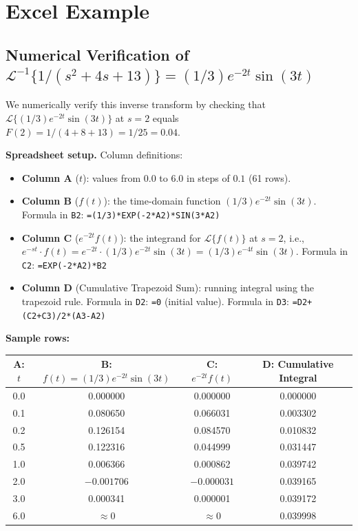 \documentclass[12pt,a4paper]{article}
\begin{document}
\section{Excel Example }

\subsection{Numerical Verification of $\mathcal{L}^{-1}\{1/(s^2+4s+13)\} = (1/3)e^{-2t}\sin(3t)$}

We numerically verify this inverse transform by checking that
$\mathcal{L}\{(1/3)e^{-2t}\sin(3t)\}$ at $s = 2$ equals
$F(2) = 1/(4 + 8 + 13) = 1/25 = 0.04$.

\medskip
\textbf{Spreadsheet setup.} Column definitions:
\begin{itemize}[leftmargin=*]
  \item \textbf{Column A} ($t$): values from $0.0$ to $6.0$ in steps of $0.1$ (61 rows).
  \item \textbf{Column B} ($f(t)$): the time-domain function $(1/3)e^{-2t}\sin(3t)$.
    Formula in \texttt{B2}: \texttt{=(1/3)*EXP(-2*A2)*SIN(3*A2)}
  \item \textbf{Column C} ($e^{-2t}f(t)$): the integrand for $\mathcal{L}\{f(t)\}$ at $s = 2$,
    i.e., $e^{-st}\cdot f(t) = e^{-2t}\cdot (1/3)e^{-2t}\sin(3t) = (1/3)e^{-4t}\sin(3t)$.
    Formula in \texttt{C2}: \texttt{=EXP(-2*A2)*B2}
  \item \textbf{Column D} (Cumulative Trapezoid Sum): running integral using the trapezoid rule.
    Formula in \texttt{D2}: \texttt{=0} (initial value).
    Formula in \texttt{D3}: \texttt{=D2+(C2+C3)/2*(A3-A2)}
\end{itemize}

\medskip
\textbf{Sample rows:}

\begin{center}
\begin{tabular}{@{}cccc@{}}
\toprule
\textbf{A: $t$} & \textbf{B: $f(t)=(1/3)e^{-2t}\sin(3t)$} &
\textbf{C: $e^{-2t}f(t)$} & \textbf{D: Cumulative Integral} \\
\midrule
0.0 & 0.000000 & 0.000000 & 0.000000 \\
0.1 & 0.080650 & 0.066031 & 0.003302 \\
0.2 & 0.126154 & 0.084570 & 0.010832 \\
0.5 & 0.122316 & 0.044999 & 0.031447 \\
1.0 & 0.006366 & 0.000862 & 0.039742 \\
2.0 & $-0.001706$ & $-0.000031$ & 0.039165 \\
3.0 & 0.000341 & 0.000001 & 0.039172 \\
6.0 & $\approx 0$ & $\approx 0$ & 0.039998 \\
\bottomrule
\end{tabular}
\end{center}
\end{document}
